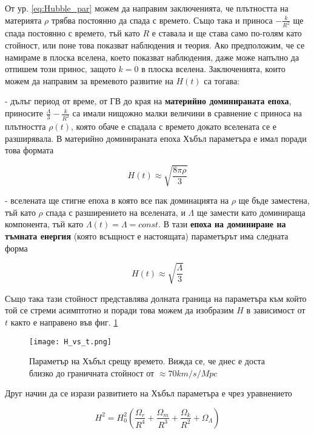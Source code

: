 \documentclass[a4paper,12pt]{article}
\begin{document}
От ур. \eqref{eq:Hubble_par} можем да направим заключенията, че плътността на материята $\rho$ трябва постоянно да спада с времето. Също така и приноса $-\frac{k}{R^2}$ ще спада постоянно с времето, тъй като $R$ е ставала и ще става само по-голям като стойност, или поне това показват наблюдения и теория. Ако предположим, че се намираме в плоска вселена, което показват наблюдения, даже може напълно да отпишем този принос, защото $k=0$ в плоска вселена. Заключенията, които можем да направим за времевото развитие на $H(t)$ са тогава:

- дълъг период от време, от ГВ до края на \textbf{материйно доминираната епоха}, приносите $\frac{\Lambda}{3} - \frac{k}{R^2}$ са имали нищожно малки величини в сравнение с приноса на плътността $\rho(t)$, която обаче е спадала с времето докато вселената се е разширявала. В материйно доминираната епоха Хъбъл параметъра е имал поради това формата

\begin{equation}
    H(t) \approx \sqrt{\frac{8\pi \rho}{3}}
\end{equation}

- вселената ще стигне епоха в която все пак доминацията на $\rho$ ще бъде заместена, тъй като $\rho$ спада с разширението на вселената, и $\Lambda$ ще замести като доминираща компонента, тъй като $\Lambda(t) = \Lambda = const$. В тази \textbf{епоха на доминиране на тъмната енергия} (която всъщност е настоящата) параметърът има следната форма

\begin{equation}
    H(t) \approx \sqrt{\frac{\Lambda}{3}}
\end{equation}

Също така тази стойност представлява долната граница на параметъра към който той се стреми асимптотно и поради това можем да изобразим $H$ в зависимост от $t$ както е направено във фиг. \ref{fig:H_vs_t}

\begin{figure}[h!] %
\centering
\texttt{[image: H\_vs\_t.png]}
\caption{Параметър на Хъбъл срещу времето. Вижда се, че днес е доста близко до граничната стойност от $\approx 70 km/s/Mpc$}
\label{fig:H_vs_t}
\end{figure}

Друг начин да се изрази развитието на Хъбъл параметъра е чрез уравнението

\begin{equation}
    \label{eq:Hubble_par2}
    H^2 = H_0^2 \left( \frac{\Omega_r}{R^4} + \frac{\Omega_m}{R^3} + \frac{\Omega_k}{R^2} + \Omega_\Lambda \right)
\end{equation}
\end{document}
